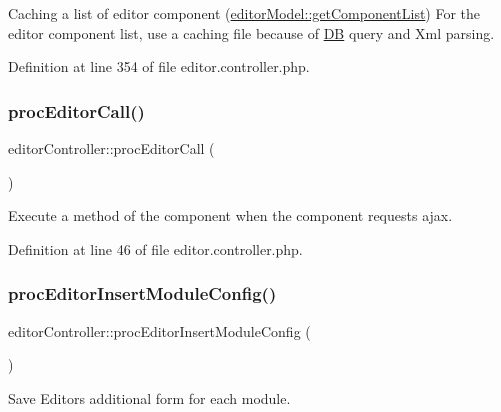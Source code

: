 Caching a list of editor component (\hyperlink{classeditorModel_a24cf5d2f9bc9783dd2efd85fb0f89408}{editor\+Model\+::get\+Component\+List}) For the editor component list, use a caching file because of \hyperlink{classDB}{DB} query and Xml parsing. 



Definition at line 354 of file editor.\+controller.\+php.

\hypertarget{classeditorController_ab7eab43a1ba21645dabcf36f32b27289}{}\label{classeditorController_ab7eab43a1ba21645dabcf36f32b27289} 
\subsubsection{\texorpdfstring{proc\+Editor\+Call()}{procEditorCall()}}
{\footnotesize\ttfamily editor\+Controller\+::proc\+Editor\+Call (\begin{DoxyParamCaption}{ }\end{DoxyParamCaption})}



Execute a method of the component when the component requests ajax. 



Definition at line 46 of file editor.\+controller.\+php.

\hypertarget{classeditorController_af20e397838bd94b60b09b0cba2d7da0d}{}\label{classeditorController_af20e397838bd94b60b09b0cba2d7da0d} 
\subsubsection{\texorpdfstring{proc\+Editor\+Insert\+Module\+Config()}{procEditorInsertModuleConfig()}}
{\footnotesize\ttfamily editor\+Controller\+::proc\+Editor\+Insert\+Module\+Config (\begin{DoxyParamCaption}{ }\end{DoxyParamCaption})}



Save Editor\textquotesingle{}s additional form for each module. 



